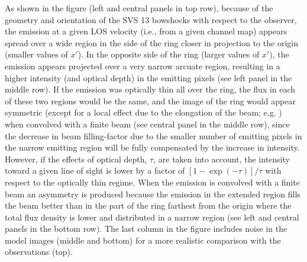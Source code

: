 \documentclass[12pt]{mythesis}
\begin{document}
As shown in the figure (left and central panels in top row), because of the geometry and orientation of the SVS 13 bowshocks with respect to the observer, the emission at a given LOS velocity (i.e., from a given channel map) appears spread over a wide region in the side of the ring closer in projection to the origin (smaller values of $x'$). In the opposite side of the ring (larger values of $x'$), the emission appears projected over a very narrow arcuate region, resulting in a higher intensity (and optical depth) in the emitting pixels (see left panel in the middle row). If the emission was optically thin all over the ring, the flux in each of these two regions would be the same, and the image of the ring would appear symmetric (except for a local effect due to the elongation of the beam; e.g. \citealt{osorio2016}) when convolved with a finite beam (see central panel in the middle row), since the decrease in beam filling-factor due to the smaller number of emitting pixels in the narrow emitting region will be fully compensated by the increase in intensity. However, if the effects of optical depth, $\tau$, are taken into account, the intensity toward a given line of sight is lower by a factor of $[1-\exp{(-\tau)}]/\tau$ with respect to the optically thin regime. When the emission is convolved with a finite beam an asymmetry is produced because the emission in the extended region fills the beam better than in the part of the ring farthest from the origin where the total flux density is lower and distributed in a narrow region (see left and central panels in the bottom row). The last column in the figure includes noise in the model images (middle and bottom) for a more realistic comparison with the observations (top).
\end{document}
